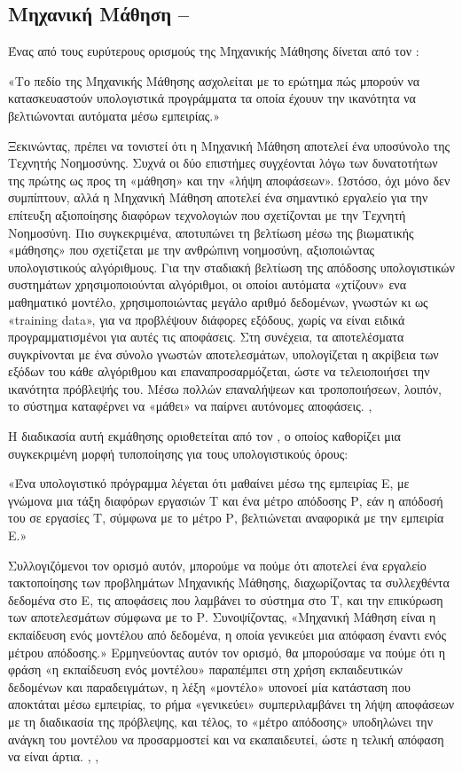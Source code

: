 \subsection{Μηχανική Μάθηση – }

Ένας από τους ευρύτερους ορισμούς της Μηχανικής Μάθησης δίνεται από τον :

«Το πεδίο της Μηχανικής Μάθησης ασχολείται με το ερώτημα πώς μπορούν να κατασκευαστούν υπολογιστικά προγράμματα τα οποία έχουυν την ικανότητα να βελτιώνονται αυτόματα μέσω εμπειρίας.»\cite{3.11}

Ξεκινώντας, πρέπει να τονιστεί ότι η Μηχανική Μάθηση αποτελεί ένα υποσύνολο της Τεχνητής Νοημοσύνης. Συχνά οι δύο επιστήμες συγχέονται λόγω των δυνατοτήτων της πρώτης ως προς τη «μάθηση» και την «λήψη αποφάσεων». Ωστόσο, όχι μόνο δεν συμπίπτουν, αλλά η Μηχανική Μάθηση αποτελεί ένα σημαντικό εργαλείο για την επίτευξη αξιοποίησης διαφόρων τεχνολογιών που σχετίζονται με την Τεχνητή Νοημοσύνη. Πιο συγκεκριμένα, αποτυπώνει τη βελτίωση μέσω της βιωματικής «μάθησης» που σχετίζεται με την ανθρώπινη νοημοσύνη, αξιοποιώντας υπολογιστικούς αλγόριθμους. Για την σταδιακή βελτίωση της απόδοσης υπολογιστικών συστημάτων χρησιμοποιούνται αλγόριθμοι, οι οποίοι αυτόματα «χτίζουν» ενα μαθηματικό μοντέλο, χρησιμοποιώντας μεγάλο αριθμό δεδομένων, γνωστών κι ως «training data», για να προβλέψουν διάφορες εξόδους, χωρίς να είναι ειδικά προγραμματισμένοι για αυτές τις αποφάσεις. Στη συνέχεια, τα αποτελέσματα συγκρίνονται με ένα σύνολο γνωστών αποτελεσμάτων, υπολογίζεται η ακρίβεια των εξόδων του κάθε αλγόριθμου και επαναπροσαρμόζεται, ώστε να τελειοποιήσει την ικανότητα πρόβλεψής του. Μέσω πολλών επαναλήψεων και τροποποιήσεων, λοιπόν, το σύστημα καταφέρνει να «μάθει» να παίρνει αυτόνομες αποφάσεις. \cite{3.3}, \cite{3.9}

Η διαδικασία αυτή εκμάθησης οριοθετείται από τον , ο οποίος καθορίζει μια συγκεκριμένη μορφή τυποποίησης για τους υπολογιστικούς όρους: 

«Ένα υπολογιστικό πρόγραμμα λέγεται ότι μαθαίνει μέσω της εμπειρίας Ε, με γνώμονα μια τάξη διαφόρων εργασιών Τ και ένα μέτρο απόδοσης Ρ, εάν η απόδοσή του σε εργασίες Τ, σύμφωνα με το μέτρο Ρ, βελτιώνεται αναφορικά με την εμπειρία Ε.» 

Συλλογιζόμενοι τον ορισμό αυτόν, μπορούμε να πούμε ότι αποτελεί ένα εργαλείο τακτοποίησης των προβλημάτων Μηχανικής Μάθησης, διαχωρίζοντας τα συλλεχθέντα δεδομένα στο Ε, τις αποφάσεις που λαμβάνει το σύστημα στο Τ, και την επικύρωση των αποτελεσμάτων σύμφωνα με το Ρ.
Συνοψίζοντας, «Μηχανική Μάθηση είναι η εκπαίδευση ενός μοντέλου από δεδομένα, η οποία γενικεύει μια απόφαση έναντι ενός μέτρου απόδοσης.» Ερμηνεύοντας αυτόν τον ορισμό, θα μπορούσαμε να πούμε ότι η φράση «η εκπαίδευση ενός μοντέλου» παραπέμπει στη χρήση εκπαιδευτικών δεδομένων και παραδειγμάτων, η λέξη «μοντέλο» υπονοεί μία κατάσταση που αποκτάται μέσω εμπειρίας, το ρήμα «γενικεύει» συμπεριλαμβάνει τη λήψη αποφάσεων με τη διαδικασία της πρόβλεψης, και τέλος, το «μέτρο απόδοσης» υποδηλώνει την ανάγκη του μοντέλου να προσαρμοστεί και να εκαπαιδευτεί, ώστε η τελική απόφαση να είναι άρτια. \cite{3.3}, \cite{3.9}, \cite{3.11}

